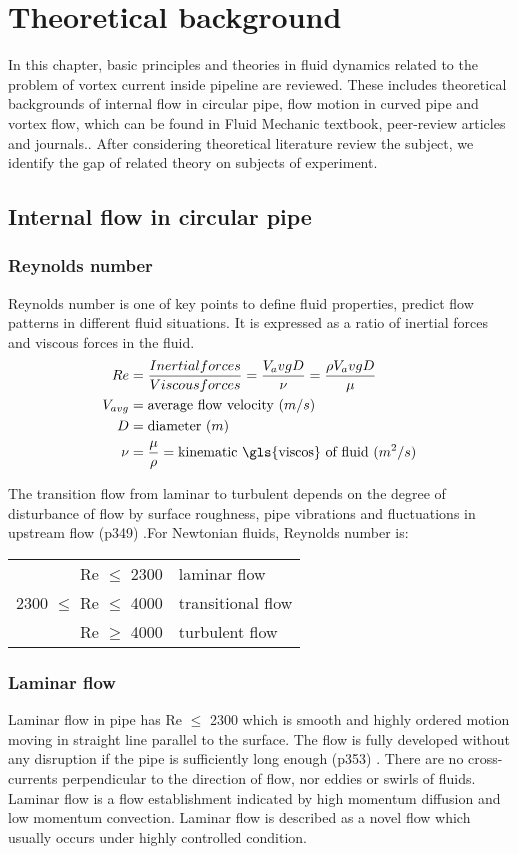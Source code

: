 
\chapter{Theoretical background}
In this chapter, basic principles and theories in fluid dynamics related to the problem of vortex current inside pipeline are reviewed. These includes theoretical backgrounds of internal flow in circular pipe, flow motion in curved pipe and vortex flow, which can be found in Fluid Mechanic textbook, peer-review articles and journals.. After considering theoretical literature review the subject, we identify the gap of related theory on subjects of experiment. 
\section{Internal flow in circular pipe}

\subsection{Reynolds number}
Reynolds number is one of key points to define fluid properties, predict flow patterns in different fluid situations. It is expressed as a ratio of inertial forces and viscous forces in the fluid. 
\begin{align}
Re & = \frac{Inertial forces}{Viscous forces} = \frac{V_avg D}{\nu} = \frac{\rho V_avg D}{\mu}  \\
V_{avg}  & = \tn{average flow velocity ($m/s$)} \\
D & = \tn{diameter ($m$)} \\
\nu & = \frac{\mu}{\rho} = \tn{kinematic \gls{viscos} of fluid ($m^2/s$)} 
\end{align}

The transition flow from laminar to turbulent depends on the degree of disturbance of flow by surface roughness, pipe vibrations and fluctuations in upstream flow (p349) \cite{cengel:book}.For Newtonian fluids, Reynolds number is:
\begin{tabular}{r l}
Re $\leq$ 2300 & laminar flow \\
2300 $\leq$ Re $\leq$ 4000 & transitional flow \\
Re $\geq$ 4000 & turbulent flow
\end{tabular}

\subsection{Laminar flow}
Laminar flow in pipe has Re $\leq$ 2300 which is smooth and highly ordered motion moving in straight line parallel to the surface. The flow is fully developed without any disruption if the pipe is sufficiently long enough (p353) \cite{cengel:book}. There are no cross-currents perpendicular to the direction of flow, nor eddies or swirls of fluids. Laminar flow is a flow establishment indicated  by high momentum diffusion and low momentum convection. Laminar flow is described as a novel flow which usually occurs under highly controlled condition.

